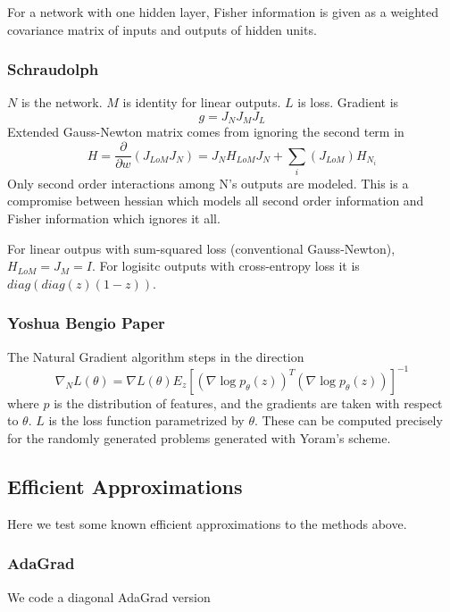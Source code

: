 \documentclass[12pt]{article}
\begin{document}
For a network with one hidden layer, Fisher information is given as a weighted covariance matrix of inputs and outputs of hidden units. 


\subsubsection{Schraudolph}
$N$ is the network. $M$ is identity for linear outputs. $L$ is loss. 
Gradient is 
\begin{equation}
	g=J_N J_M J_L
\end{equation}
Extended Gauss-Newton matrix comes from ignoring the second term in 
\begin{equation}
	H = \frac{\partial}{\partial w} (J_{LoM} J_N)  = J_N H_{LoM} J_N + \sum_i (J_{LoM}) H_{N_i}
\end{equation}
Only second order interactions among N's outputs are modeled. This is a compromise between hessian which models all second order information and Fisher information which ignores it all. 

For linear outpus with sum-squared loss (conventional Gauss-Newton), $H_{LoM}  = J_M = I$. For logisitc outputs with cross-entropy loss it is $diag(diag(z)(1-z))$.


\subsubsection{Yoshua Bengio Paper}
The Natural Gradient algorithm steps in the direction
\begin{equation}
\nabla_N L(\theta) = \nabla L(\theta) E_z \left[ (\nabla \log p_{\theta}(z))^T  (\nabla \log p_{\theta}(z)) \right]^{-1}
\end{equation}
where $p$ is the distribution of features, and the gradients are taken with respect to $\theta$. $L$ is the loss function parametrized by $\theta$.
These can be computed precisely for the randomly generated problems generated with Yoram's scheme. 
   
  

\subsection{Efficient Approximations}
Here we test some known efficient approximations to the methods above.

\subsubsection{AdaGrad}
We code a diagonal AdaGrad version
\end{document}
